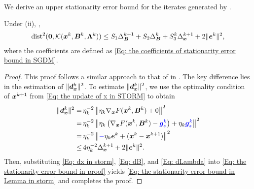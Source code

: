 We derive an upper stationarity error bound for the iterates generated by .
\begin{lemma}
    \label{Lemma: Stationarity error bound} Under (ii),
    ,
    \begin{align}
        \mathrm{dist}^{2}(\bm{0}, \mathcal K(\bx^{k}, \bB^{k}, \bm{\Lambda}^{k})) \leq S_{1}\Delta_{\bB}^{k+1}+ S_{2}\Delta_{\bB}^{k}+ S_{3}^{k}\Delta_{\bm{x}}^{k+1}+ 2 \| \be^{k}\|^{2}, \label{Eq: the stationarity error bound in Lemma in storm}
    \end{align}
    where the coefficients are defined as \eqref{Eq: the coefficients of stationarity error bound in SGDM}.
\end{lemma}
\begin{proof}
    This proof follows a similar approach to that of  
in . The key difference lies in 
the estimation of $\| \bm{d}_{\bm{x}}^{k}\|^{2}$. To estimate $\| \bm{d}_{\bm{x}}^{k}\|^{2}$, we use 
the optimality condition of $\bm{x}^{k+1}$ from \eqref{Eq: the update of x in STORM} to obtain
    \begin{align}
        \|\bd_{\bx}^{k}\|^{2}= & \,\eta_{k}^{-2}\left\| \eta_{k}\nabla_{\bx}F(\bx^{k}, \bm{B}^{k}) + 0\right\|^{2}\notag                                       \\
        =                      & \, \eta_{k}^{-2}\left\|\eta_{k}\left( \nabla_{\bx}F(\bx^{k}, \bm{B}^{k}) - \blue{\bg_s^{k}}\right) + \eta_{k}\blue{\bg_s^{k}}\right\|^{2}\notag \\
        =                      & \, \eta_{k}^{-2}\left\|\blue{-}\eta_{k}\be^{k}+ (\bx^{k}- \bx^{k+1})\right\|^{2}\notag                                                \\
        \leq                   & \, 4\eta_{k}^{-2}\Delta_{\bx}^{k+1}+ 2 \| \be^{k}\|^{2}.\label{Eq: dx in storm}
    \end{align}
    Then, substituting \eqref{Eq: dx in storm}, \eqref{Eq: dB}, and \eqref{Eq: dLambda}
    into \eqref{Eq: the stationarity error bound in proof} yields \eqref{Eq: the stationarity error bound in Lemma in storm}
    and completes the proof. 
\end{proof}

